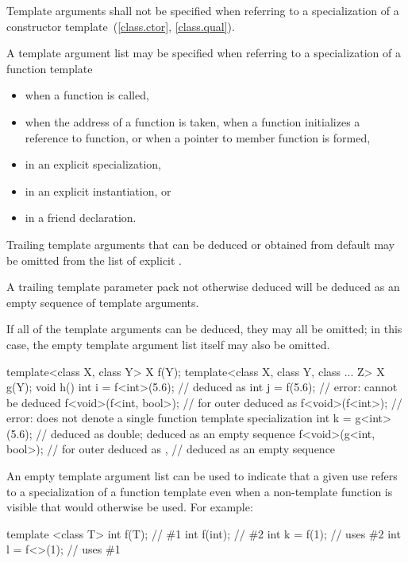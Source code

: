 \pnum
Template arguments shall not be specified
when referring to a specialization of
a constructor template~(\ref{class.ctor}, \ref{class.qual}).

\pnum
A template argument list may be specified when referring to a specialization
of a function template
\begin{itemize}
\item
when a function is called,
\item
when the address of a function is taken, when a function initializes a
reference to function, or when a pointer to member function is formed,
\item
in an explicit specialization,
\item
in an explicit instantiation, or
\item
in a friend declaration.
\end{itemize}

\pnum
Trailing template arguments that can be deduced or
obtained from default 
may be omitted from the list of explicit .
\begin{note}
A trailing template parameter pack not otherwise deduced will be
deduced as an empty sequence of template arguments.
\end{note}
If all of the template arguments can be deduced, they may all be omitted;
in this case, the empty template argument list \tcode{<>}
itself may also be omitted.
\begin{example}
\begin{codeblock}
template<class X, class Y> X f(Y);
template<class X, class Y, class ... Z> X g(Y);
void h() {
  int i = f<int>(5.6);          //  deduced as 
  int j = f(5.6);               // error:  cannot be deduced
  f<void>(f<int, bool>);        //  for outer  deduced as 
  f<void>(f<int>);              // error:  does not denote a single function template specialization
  int k = g<int>(5.6);          //  deduced as double;  deduced as an empty sequence
  f<void>(g<int, bool>);        //  for outer  deduced as ,
                                //  deduced as an empty sequence
}
\end{codeblock}
\end{example}

\pnum
\begin{note}
An empty template argument list can be used to indicate that a given
use refers to a specialization of a function template even when a
non-template function is visible that would otherwise be used.
For example:
\begin{codeblock}
template <class T> int f(T);    // \#1
int f(int);                     // \#2
int k = f(1);                   // uses \#2
int l = f<>(1);                 // uses \#1
\end{codeblock}
\end{note}

